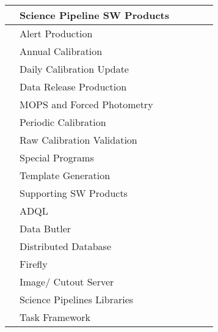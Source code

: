 \begin{longtable}{|p{}|p{}|p{}|p{}|p{}|p{}|}
 &  Science Pipeline SW Products &  &  &  & \\ \hline
 &  Alert Production &  &  &  & \\ \hline
 &  Annual Calibration &  &  &  & \\ \hline
 &  Daily Calibration Update &  &  &  & \\ \hline
 &  Data Release Production &  &  &  & \\ \hline
 &  MOPS and Forced Photometry &  &  &  & \\ \hline
 &  Periodic Calibration &  &  &  & \\ \hline
 &  Raw Calibration Validation &  &  &  & \\ \hline
 &  Special Programs &  &  &  & \\ \hline
 &  Template Generation &  &  &  & \\ \hline
 &  Supporting SW Products &  &  &  & \\ \hline
 &  ADQL &  &  &  & \\ \hline
 &  Data Butler &  &  &  & \\ \hline
 &  Distributed Database &  &  &  & \\ \hline
 &  Firefly &  &  &  & \\ \hline
 &  Image/ Cutout Server &  &  &  & \\ \hline
 &  Science Pipelines Libraries &  &  &  & \\ \hline
 &  Task Framework &  &  &  & \\ \hline
\end{longtable}
\normalsize
